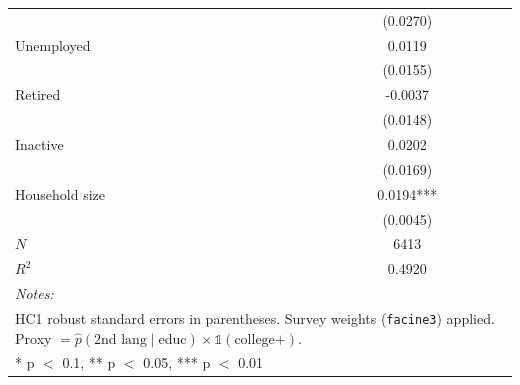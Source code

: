 \begin{table}
\begin{tabular}[t]{lc}
 & (0.0270)\\
\hspace{6pt} Unemployed & 0.0119\\
 & (0.0155)\\
\hspace{6pt} Retired & -0.0037\\
 & (0.0148)\\
\hspace{6pt} Inactive & 0.0202\\
 & (0.0169)\\
Household size & 0.0194***\\
 & (0.0045)\\
\midrule
$N$ & 6413\\
$R^2$ & 0.4920\\
\bottomrule
\multicolumn{2}{l}{\rule{0pt}{1em}\textit{Notes: }}\\
\multicolumn{2}{l}{\rule{0pt}{1em}HC1 robust standard errors in parentheses. Survey weights (\texttt{facine3}) applied. Proxy $= \hat{p}(\text{2nd lang} \mid \text{educ}) \times \mathbb{1}(\text{college+})$.}\\
\multicolumn{2}{l}{\rule{0pt}{1em}* p $<$ 0.1, ** p $<$ 0.05, *** p $<$ 0.01}\\
\end{tabular}
\end{table}
